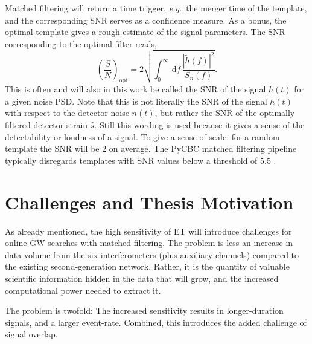 Matched filtering will return a time trigger, \emph{e.g.}\ the merger time of the template, and the corresponding SNR serves as a confidence measure. As a bonus, the optimal template gives a rough estimate of the signal parameters.
The SNR corresponding to the optimal filter reads,
\begin{equation}
	\label{eq:matched_filtering:optimal_snr}
	\left(\frac{S}{N}\right)_\text{opt}
	= 2\sqrt{\int_0^\infty\,\mathrm{d}f\,\frac{|\tilde{h}(f)|^2}{S_n(f)}}.
\end{equation}
This is often and will also in this work be called the SNR of the signal $h(t)$ for a given noise PSD. Note that this is not literally the SNR of the signal $h(t)$ with respect to the detector noise $n(t)$, 
but rather the SNR of the optimally filtered detector strain $\hat{s}$. Still this wording is used because it gives a sense of the detectability or loudness of a signal. 
To give a sense of scale: for a random template the SNR will be $2$ on average.
The PyCBC matched filtering pipeline typically disregards templates with SNR values below a threshold of $5.5$ \cite{Usman_2016}.

\section{Challenges and Thesis Motivation}


As already mentioned, the high sensitivity of ET will introduce challenges for online GW searches with matched filtering. The problem is less an increase in data volume from the six interferometers (plus auxiliary channels) compared to the existing second-generation network. Rather, it is the quantity of valuable scientific information hidden in the data that will grow, and the increased computational power needed to extract it.

The problem is twofold: The increased sensitivity results in longer-duration signals, and a larger event-rate. Combined, this introduces the added challenge of signal overlap. 

